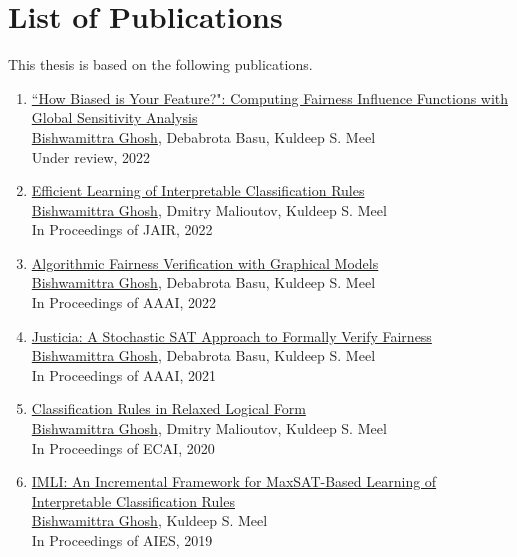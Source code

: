 
\section*{List of Publications}
This thesis is based on the following publications.

\begin{enumerate}
	
	\item \href{https://arxiv.org/pdf/2206.00667.pdf}{``How Biased is Your Feature?": Computing Fairness Influence Functions with Global Sensitivity Analysis}\\
	\underline{Bishwamittra Ghosh}, Debabrota Basu, Kuldeep S. Meel\\
	Under review, 2022
	
	\item \href{https://arxiv.org/pdf/2205.06936.pdf}{Efficient Learning of Interpretable Classification Rules} \\
	\underline{Bishwamittra Ghosh}, Dmitry Malioutov, Kuldeep S. Meel\\
	In Proceedings of JAIR, 2022
	
	\item \href{https://arxiv.org/pdf/2109.09447.pdf}{Algorithmic Fairness Verification with Graphical Models} \\
	\underline{Bishwamittra Ghosh}, Debabrota Basu, Kuldeep S. Meel\\
	In Proceedings of AAAI, 2022
		
	\item \href{https://arxiv.org/pdf/2009.06516.pdf}{Justicia: A Stochastic SAT Approach to Formally Verify Fairness} \\
	\underline{Bishwamittra Ghosh}, Debabrota Basu, Kuldeep S. Meel\\
	In Proceedings of AAAI, 2021
	
	
	\item \href{https://bishwamittra.github.io/publication/ecai_2020/paper.pdf}{Classification Rules in Relaxed Logical Form
	} \\
	\underline{Bishwamittra Ghosh}, Dmitry Malioutov, Kuldeep S. Meel\\
	In Proceedings of ECAI, 2020
	
	\item \href{https://bishwamittra.github.io/publication/imli-ghosh.pdf}{IMLI: An Incremental Framework for MaxSAT-Based Learning of Interpretable Classification Rules}\\
	\underline{Bishwamittra Ghosh}, Kuldeep S. Meel\\
	In Proceedings of AIES, 2019
	
	
\end{enumerate}
\clearpage
